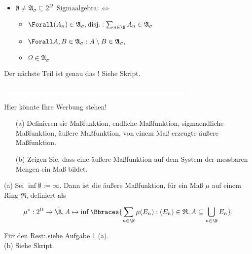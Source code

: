 \begin{solution}
\begin{itemize}
  \item $\emptyset \neq \mathfrak{A}_\sigma \subseteq 2^\Omega \enspace \text{Sigmaalgebra} : \Leftrightarrow$
  \begin{itemize}
    \item $\Forall (A_n) \in \mathfrak{A}_\sigma, \text{disj.}: \sum_{n \in \N} A_n \in \mathfrak{A}_\sigma$
    \item $\Forall A, B \in \mathfrak{A}_\sigma: A \setminus B \in \mathfrak{A}_\sigma,$
    \item $\Omega \in \mathfrak{A}_\sigma$
  \end{itemize}

\end{itemize}

Der nächste Teil ist genau das ! Siehe Skript.

\end{solution}

--------------------------------------------------------------------------------

\begin{exercise}

Hier könnte Ihre Werbung stehen!

\begin{itemize}
  \item[(a)] Definieren sie Maßfunktion, endliche Maßfunktion, sigmaendliche Maßfunktion, äußere Maßfunktion, von einem Maß erzeugte äußere Maßfunktion.
  \item[(b)] Zeigen Sie, dass eine äußere Maßfunktion auf dem System der messbaren Mengen ein Maß bildet.
\end{itemize}

\end{exercise}

\begin{solution}

(a) Sei $\inf \emptyset := \infty$. Dann ist die äußere Maßfunktion, für ein Maß $\mu$ auf einem Ring $\mathfrak{R}$, definiert als

\begin{align*}
  \mu^\ast:
  2^\Omega \to \bar \R,
  A \mapsto \inf \Bbraces{\sum_{n \in \N} \mu(E_n): (E_n) \in \mathfrak{R}, A \subseteq \bigcup_{n \in \N} E_n}.
\end{align*}

Für den Rest: siehe Aufgabe 1 (a). \\

(b) Siehe Skript.

\end{solution}

